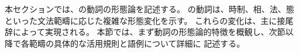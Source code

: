本セクションでは、\langname の動詞の形態論を記述する。
\langname の動詞は、時制、相、法、態といった文法範疇に応じた複雑な形態変化を示す。
これらの変化は、主に接尾辞によって実現される。
本節では、まず動詞の形態論的特徴を概観し、次節以降で各範疇の具体的な活用規則と語例について詳細に
記述する。